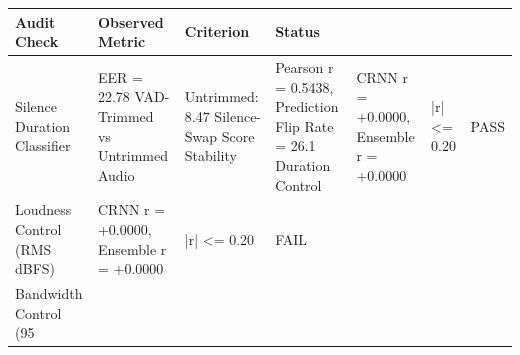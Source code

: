 \begin{tabular}{llll}
\toprule
Audit Check & Observed Metric & Criterion & Status \\
\midrule
Silence Duration Classifier & EER = 22.78%
VAD-Trimmed vs Untrimmed Audio & Untrimmed: 8.47%
Silence-Swap Score Stability & Pearson r = 0.5438, Prediction Flip Rate = 26.1%
Duration Control & CRNN r = +0.0000, Ensemble r = +0.0000 & |r| <= 0.20 & PASS \\
Loudness Control (RMS dBFS) & CRNN r = +0.0000, Ensemble r = +0.0000 & |r| <= 0.20 & FAIL \\
Bandwidth Control (95%
\bottomrule
\end{tabular}
